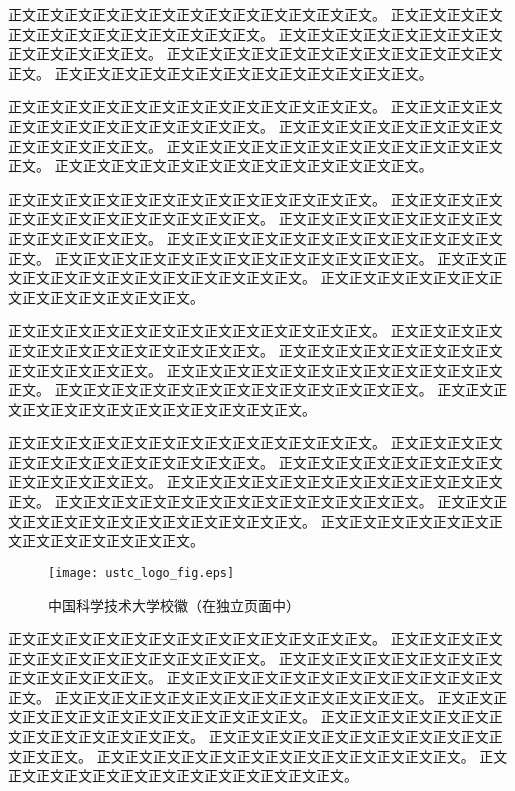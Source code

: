 正文正文正文正文正文正文正文正文正文正文正文正文正文。
正文正文正文正文正文正文正文正文正文正文正文正文正文。
正文正文正文正文正文正文正文正文正文正文正文正文正文。
正文正文正文正文正文正文正文正文正文正文正文正文正文。
正文正文正文正文正文正文正文正文正文正文正文正文正文。

正文正文正文正文正文正文正文正文正文正文正文正文正文。
正文正文正文正文正文正文正文正文正文正文正文正文正文。
正文正文正文正文正文正文正文正文正文正文正文正文正文。
正文正文正文正文正文正文正文正文正文正文正文正文正文。
正文正文正文正文正文正文正文正文正文正文正文正文正文。

正文正文正文正文正文正文正文正文正文正文正文正文正文。
正文正文正文正文正文正文正文正文正文正文正文正文正文。
正文正文正文正文正文正文正文正文正文正文正文正文正文。
正文正文正文正文正文正文正文正文正文正文正文正文正文。
正文正文正文正文正文正文正文正文正文正文正文正文正文。
正文正文正文正文正文正文正文正文正文正文正文正文正文。
正文正文正文正文正文正文正文正文正文正文正文正文正文。

正文正文正文正文正文正文正文正文正文正文正文正文正文。
正文正文正文正文正文正文正文正文正文正文正文正文正文。
正文正文正文正文正文正文正文正文正文正文正文正文正文。
正文正文正文正文正文正文正文正文正文正文正文正文正文。
正文正文正文正文正文正文正文正文正文正文正文正文正文。
正文正文正文正文正文正文正文正文正文正文正文正文正文。

正文正文正文正文正文正文正文正文正文正文正文正文正文。
正文正文正文正文正文正文正文正文正文正文正文正文正文。
正文正文正文正文正文正文正文正文正文正文正文正文正文。
正文正文正文正文正文正文正文正文正文正文正文正文正文。
正文正文正文正文正文正文正文正文正文正文正文正文正文。
正文正文正文正文正文正文正文正文正文正文正文正文正文。
正文正文正文正文正文正文正文正文正文正文正文正文正文。

\begin{figure}[p]
 \centering
 \texttt{[image: ustc\_logo\_fig.eps]}
 \caption{中国科学技术大学校徽（在独立页面中）}
 \label{fig:amss4}
\end{figure}

正文正文正文正文正文正文正文正文正文正文正文正文正文。
正文正文正文正文正文正文正文正文正文正文正文正文正文。
正文正文正文正文正文正文正文正文正文正文正文正文正文。
正文正文正文正文正文正文正文正文正文正文正文正文正文。
正文正文正文正文正文正文正文正文正文正文正文正文正文。
正文正文正文正文正文正文正文正文正文正文正文正文正文。
正文正文正文正文正文正文正文正文正文正文正文正文正文。
正文正文正文正文正文正文正文正文正文正文正文正文正文。
正文正文正文正文正文正文正文正文正文正文正文正文正文。
正文正文正文正文正文正文正文正文正文正文正文正文正文。
